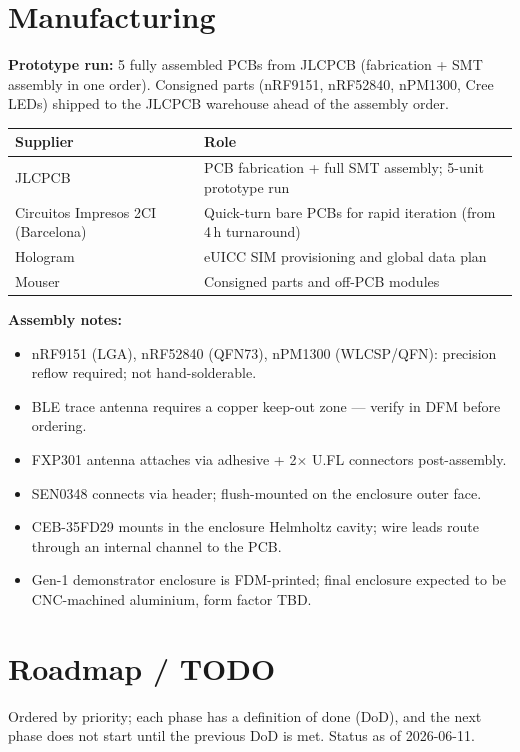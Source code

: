 \documentclass[11pt,a4paper]{article}
\begin{document}
\section{Manufacturing}

\textbf{Prototype run:} 5 fully assembled PCBs from JLCPCB (fabrication + SMT assembly in one order). Consigned parts (nRF9151, nRF52840, nPM1300, Cree LEDs) shipped to the JLCPCB warehouse ahead of the assembly order.

\begin{table}[h]
\small
\begin{tabularx}{\textwidth}{lL}
\toprule
\textbf{Supplier} & \textbf{Role}\\
\midrule
JLCPCB & PCB fabrication + full SMT assembly; 5-unit prototype run\\
Circuitos Impresos 2CI (Barcelona) & Quick-turn bare PCBs for rapid iteration (from 4\,h turnaround)\\
Hologram & eUICC SIM provisioning and global data plan\\
Mouser & Consigned parts and off-PCB modules\\
\bottomrule
\end{tabularx}
\end{table}

\textbf{Assembly notes:}
\begin{itemize}
  \item nRF9151 (LGA), nRF52840 (QFN73), nPM1300 (WLCSP/QFN): precision reflow required; not hand-solderable.
  \item BLE trace antenna requires a copper keep-out zone --- verify in DFM before ordering.
  \item FXP301 antenna attaches via adhesive + 2$\times$ U.FL connectors post-assembly.
  \item SEN0348 connects via header; flush-mounted on the enclosure outer face.
  \item CEB-35FD29 mounts in the enclosure Helmholtz cavity; wire leads route through an internal channel to the PCB.
  \item Gen-1 demonstrator enclosure is FDM-printed; final enclosure expected to be CNC-machined aluminium, form factor TBD.
\end{itemize}

\section{Roadmap / TODO}

Ordered by priority; each phase has a definition of done (DoD), and the next phase does not start until the previous DoD is met. Status as of 2026-06-11.
\end{document}
